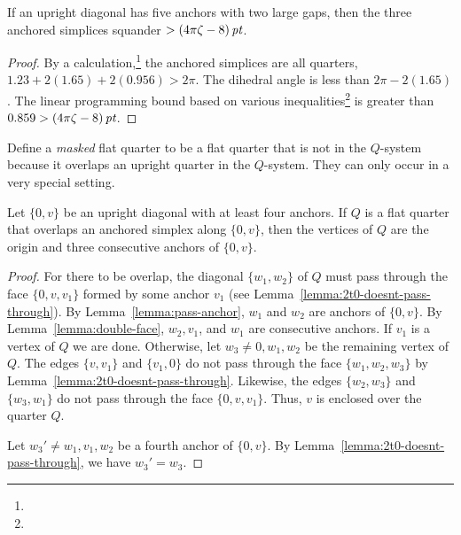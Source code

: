 \begin{lemma}
If an upright diagonal has five anchors with two large
gaps, then the three anchored simplices squander $>(4\pi\zeta-8)\,\hbox{\it pt}$.
\end{lemma}

\begin{proof}
By a calculation,\footnote{} %
the anchored simplices are all quarters,
    $1.23+2(1.65)+2(0.956)>2\pi$.
The dihedral angle is less than $2\pi-2(1.65)$.  The linear programming
bound based on various inequalities\footnote{} %
is greater than $0.859>(4\pi\zeta-8)\,\hbox{\it pt}$.
\end{proof}

\begin{definition}
Define a {\it masked\/} flat quarter to be a flat quarter that is not in
the $Q$-system because it overlaps an upright quarter in the $Q$-system.
They can only occur in a very special setting.
\end{definition}

\begin{lemma}
Let $\{0,v\}$ be an upright diagonal with at least four anchors. If
$Q$ is a flat quarter that overlaps an anchored simplex along
$\{0,v\}$, then the vertices of $Q$ are the origin and three
consecutive anchors of $\{0,v\}$.
\end{lemma}

\begin{proof}
For there to be overlap, the diagonal $\{w_1,w_2\}$ of $Q$ must pass
through the face $\{0,v,v_1\}$ formed by some anchor $v_1$  (see
Lemma~\ref{lemma:2t0-doesnt-pass-through}).  By
Lemma~\ref{lemma:pass-anchor}, $w_1$ and $w_2$ are anchors of
$\{0,v\}$. By Lemma~\ref{lemma:double-face}, $w_2,v_1$, and $w_1$
are consecutive anchors. If $v_1$ is a vertex of $Q$ we are done.
Otherwise, let $w_3\ne 0,w_1,w_2$ be the remaining vertex of $Q$.
The edges $\{v,v_1\}$ and $\{v_1,0\}$ do not pass through the face
$\{w_1,w_2,w_3\}$ by Lemma~\ref{lemma:2t0-doesnt-pass-through}.
Likewise, the edges $\{w_2,w_3\}$ and $\{w_3,w_1\}$ do not pass
through the face $\{0,v,v_1\}$. Thus, $v$ is enclosed over the
quarter $Q$.


Let $w_3'\ne w_1,v_1,w_2$ be a fourth anchor of $\{0,v\}$. By
Lemma~\ref{lemma:2t0-doesnt-pass-through}, we have $w_3'=w_3$.
\end{proof}

